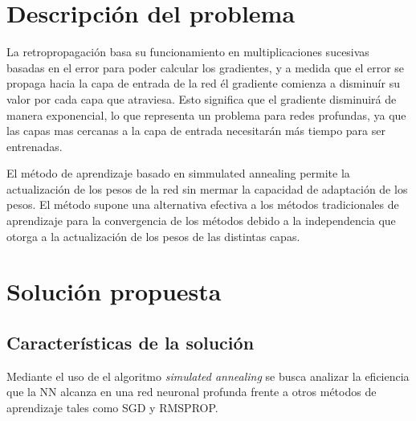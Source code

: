 \section{Descripción del problema}
La retropropagación basa su funcionamiento en multiplicaciones sucesivas basadas en el error para poder calcular los gradientes, y a medida que el error se propaga hacia la capa de entrada de la red él gradiente comienza a disminuír su valor por cada capa que atraviesa. Esto significa que el gradiente disminuirá de manera exponencial, lo que representa un problema para redes profundas, ya que las capas mas cercanas a la capa de entrada necesitarán más tiempo para ser entrenadas.

El método de aprendizaje basado en simmulated annealing permite la actualización de los pesos de la red sin mermar la capacidad de adaptación de los pesos. El método supone una alternativa efectiva a los métodos tradicionales de aprendizaje para la convergencia de los métodos debido a la independencia que otorga a la actualización de los pesos de las distintas capas.



\section{Solución propuesta}
\subsection{Características de la solución}
Mediante el uso de el algoritmo {\em simulated annealing} se busca analizar la eficiencia que la NN alcanza en una red neuronal profunda frente a otros métodos de aprendizaje tales como SGD y RMSPROP.

